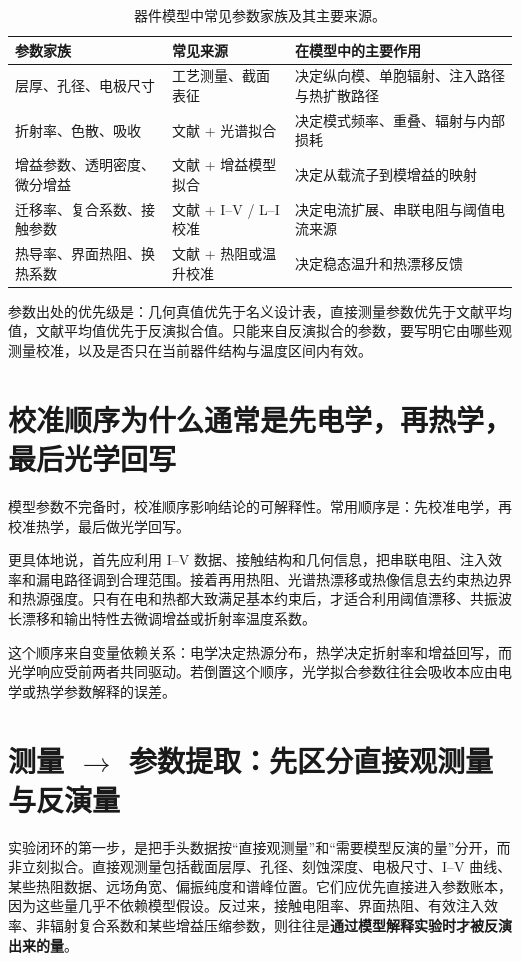 \begin{table}[htbp]
  \centering
  \footnotesize
  \caption{器件模型中常见参数家族及其主要来源。}
  \label{tab:device_params_appendix}
  \begin{tabular}{>{\raggedright\arraybackslash}p{2.6cm}>{\raggedright\arraybackslash}p{3.1cm}>{\raggedright\arraybackslash}p{5.2cm}}
    \toprule
    参数家族 & 常见来源 & 在模型中的主要作用 \\
    \midrule
    层厚、孔径、电极尺寸 & 工艺测量、截面表征 & 决定纵向模、单胞辐射、注入路径与热扩散路径 \\
    折射率、色散、吸收 & 文献 + 光谱拟合 & 决定模式频率、重叠、辐射与内部损耗 \\
    增益参数、透明密度、微分增益 & 文献 + 增益模型拟合 & 决定从载流子到模增益的映射 \\
    迁移率、复合系数、接触参数 & 文献 + I--V / L--I 校准 & 决定电流扩展、串联电阻与阈值电流来源 \\
    热导率、界面热阻、换热系数 & 文献 + 热阻或温升校准 & 决定稳态温升和热漂移反馈 \\
    \bottomrule
  \end{tabular}
\end{table}

参数出处的优先级是：几何真值优先于名义设计表，直接测量参数优先于文献平均值，文献平均值优先于反演拟合值。只能来自反演拟合的参数，要写明它由哪些观测量校准，以及是否只在当前器件结构与温度区间内有效。

\section{校准顺序为什么通常是先电学，再热学，最后光学回写}
模型参数不完备时，校准顺序影响结论的可解释性。常用顺序是：先校准电学，再校准热学，最后做光学回写。

更具体地说，首先应利用 I--V 数据、接触结构和几何信息，把串联电阻、注入效率和漏电路径调到合理范围。接着再用热阻、光谱热漂移或热像信息去约束热边界和热源强度。只有在电和热都大致满足基本约束后，才适合利用阈值漂移、共振波长漂移和输出特性去微调增益或折射率温度系数。

这个顺序来自变量依赖关系：电学决定热源分布，热学决定折射率和增益回写，而光学响应受前两者共同驱动。若倒置这个顺序，光学拟合参数往往会吸收本应由电学或热学参数解释的误差。

\section{测量 \texorpdfstring{$\rightarrow$}{->} 参数提取：先区分直接观测量与反演量}
实验闭环的第一步，是把手头数据按“直接观测量”和“需要模型反演的量”分开，而非立刻拟合。直接观测量包括截面层厚、孔径、刻蚀深度、电极尺寸、I--V 曲线、某些热阻数据、远场角宽、偏振纯度和谱峰位置。它们应优先直接进入参数账本，因为这些量几乎不依赖模型假设。反过来，接触电阻率、界面热阻、有效注入效率、非辐射复合系数和某些增益压缩参数，则往往是\textbf{通过模型解释实验时才被反演出来的量}。

